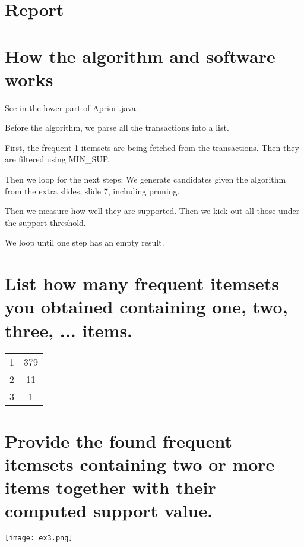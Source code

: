 \documentclass[ngerman]{dis-template-add}
\begin{document}
\section*{Report}

\section{How the algorithm and software works}

See in the lower part of Apriori.java.

Before the algorithm, we parse all the transactions into a list.

First, the frequent 1-itemsets are being fetched from the transactions.
Then they are filtered using MIN\_SUP.

Then we loop for the next steps:
We generate candidates given the algorithm from the extra slides, slide 7, including pruning.

Then we measure how well they are supported.
Then we kick out all those under the support threshold.

We loop until one step has an empty result.
 
\section{List how many frequent itemsets you obtained containing {one, two, three, ...} items.}

\begin{center}
\begin{tabular}{ c | c }
 1 & 379  \\ 
 2 & 11  \\  
 3 & 1     
\end{tabular}
\end{center}
 
\section{Provide the found frequent itemsets containing two or more items together with their computed support value.}

\texttt{[image: ex3.png]}
  
\end{document}
